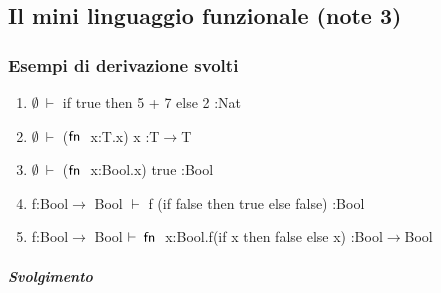 \subsection{Il mini linguaggio funzionale (note 3)}
\subsubsection*{Esempi di derivazione svolti}
 
\begin{enumerate}[label=\alph*)]
	\item $\emptyset\:\vdash$  if true then 5 + 7 else 2 :Nat
	\item $\emptyset\:\vdash$  ($\fn$ x:T.x) x :T$\rightarrow$T
	\item $\emptyset\:\vdash$  ($\fn$ x:Bool.x) true :Bool
	\item f:Bool$\rightarrow$ Bool $\vdash$ f (if false then true else false) :Bool
	\item f:Bool$\rightarrow$ Bool $\vdash\:\fn$ x:Bool.f(if x then false else x) :Bool$\rightarrow$Bool
\end{enumerate}

\subparagraph{Svolgimento}

